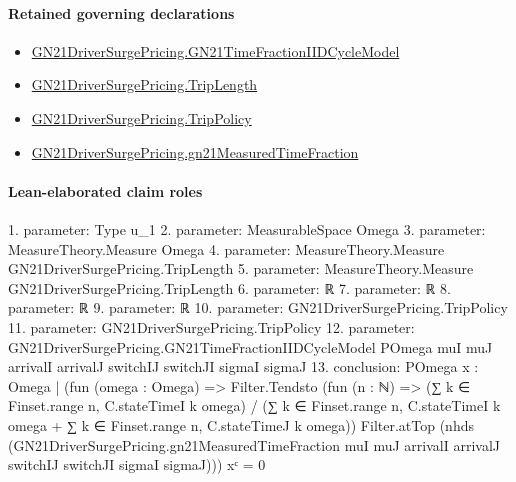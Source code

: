 \documentclass[10pt]{article}
\begin{document}
\paragraph{Retained governing declarations}
\begin{itemize}\raggedright
\item \hyperlink{paper-prerequisite-be12410503a9b0bd}{GN21\allowbreak{}Driver\allowbreak{}Surge\allowbreak{}Pricing.\allowbreak{}GN21\allowbreak{}Time\allowbreak{}Fraction\allowbreak{}IID\allowbreak{}Cycle\allowbreak{}Model}
\item \hyperlink{governing-declaration-a616c143f22cf2bc}{GN21\allowbreak{}Driver\allowbreak{}Surge\allowbreak{}Pricing.\allowbreak{}Trip\allowbreak{}Length}
\item \hyperlink{governing-declaration-4312ad4cb899871f}{GN21\allowbreak{}Driver\allowbreak{}Surge\allowbreak{}Pricing.\allowbreak{}Trip\allowbreak{}Policy}
\item \hyperlink{governing-declaration-b546250b44884c6e}{GN21\allowbreak{}Driver\allowbreak{}Surge\allowbreak{}Pricing.\allowbreak{}gn21\allowbreak{}Measured\allowbreak{}Time\allowbreak{}Fraction}
\end{itemize}
\paragraph{Lean-elaborated claim roles}\begin{ReviewVerbatim}
1. parameter: Type u_1
2. parameter: MeasurableSpace Omega
3. parameter: MeasureTheory.Measure Omega
4. parameter: MeasureTheory.Measure GN21DriverSurgePricing.TripLength
5. parameter: MeasureTheory.Measure GN21DriverSurgePricing.TripLength
6. parameter: ℝ
7. parameter: ℝ
8. parameter: ℝ
9. parameter: ℝ
10. parameter: GN21DriverSurgePricing.TripPolicy
11. parameter: GN21DriverSurgePricing.TripPolicy
12. parameter: GN21DriverSurgePricing.GN21TimeFractionIIDCycleModel POmega muI muJ arrivalI arrivalJ switchIJ switchJI sigmaI sigmaJ
13. conclusion: POmega
    {x : Omega |
        (fun (omega : Omega) =>
            Filter.Tendsto
              (fun (n : ℕ) =>
                (∑ k ∈ Finset.range n, C.stateTimeI k omega) /
                  (∑ k ∈ Finset.range n, C.stateTimeI k omega + ∑ k ∈ Finset.range n, C.stateTimeJ k omega))
              Filter.atTop
              (nhds
                (GN21DriverSurgePricing.gn21MeasuredTimeFraction muI muJ arrivalI arrivalJ switchIJ switchJI sigmaI
                  sigmaJ)))
          x}ᶜ =
  0
\end{ReviewVerbatim}
\end{document}
